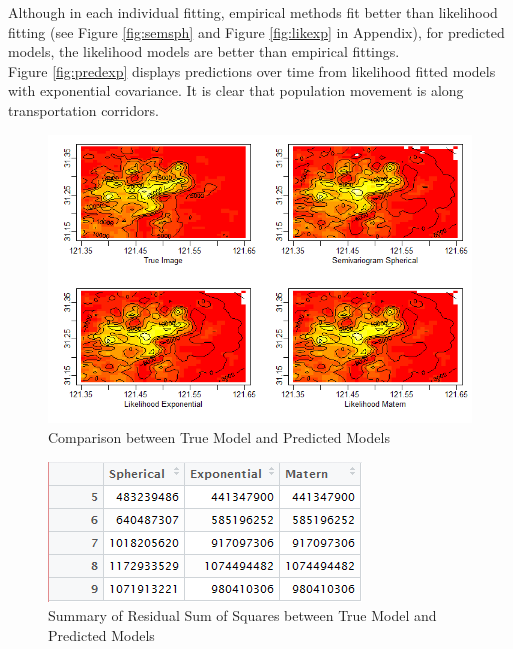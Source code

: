 \documentclass[hidelinks,12pt]{article}
\begin{document}
	Although in each individual fitting, empirical methods fit better than likelihood fitting (see Figure \ref{fig:semsph} and Figure \ref{fig:likexp} in Appendix), for predicted models, the likelihood models are better than empirical fittings.\\
	
	Figure \ref{fig:predexp} displays predictions over time from likelihood fitted models with exponential covariance. It is clear that population movement is along transportation corridors.
	\begin{figure}[!ht]
		\includegraphics[width=\textwidth]{prediction_at_5.png}
		\caption{Comparison between True Model and Predicted Models \label{fig:pred5}}
	\end{figure}
\FloatBarrier

	\begin{figure}[!ht]
		\centering
		\includegraphics{pred_result_total.png}
		\caption{Summary of Residual Sum of Squares between True Model and Predicted Models \label{fig:predsum}}
	\end{figure}
\FloatBarrier
\end{document}
